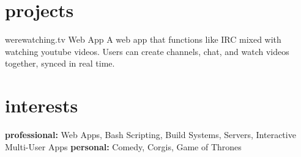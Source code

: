 \documentclass[]{friggeri-cv} %
\begin{document}
\section{projects}

\begin{entrylist}


\entry
{}
{werewatching.tv}
{Web App}
{A web app that functions like IRC mixed with watching youtube videos. Users can create channels, chat, and watch videos together, synced in real time.}


\end{entrylist}


\section{interests}

\textbf{professional:} Web Apps, Bash Scripting, Build Systems, Servers, Interactive Multi-User Apps \textbf{personal:} Comedy, Corgis, Game of Thrones
\end{document}
